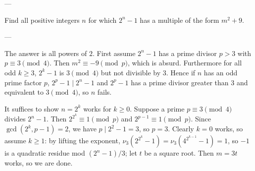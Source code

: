 
---

Find all positive integers $n$ for which $2^n-1$ has a multiple of the form $m^2+9$.

---

The answer is all powers of $2$. First assume $2^n-1$ has a prime divisor $p>3$ with $p\equiv3\pmod4$. Then $m^2\equiv-9\pmod p$, which is absurd. Furthermore for all odd $k\ge3$, $2^k-1$ is $3\pmod4$ but not divisible by $3$. Hence if $n$ has an odd prime factor $p$, $2^p-1\mid2^n-1$ and $2^p-1$ has a prime divisor greater than $3$ and equivalent to $3\pmod4$, so $n$ fails.

It suffices to show $n=2^k$ works for $k\ge0$. Suppose a prime $p\equiv3\pmod4$ divides $2^n-1$. Then $2^{2^k}\equiv1\pmod p$ and $2^{p-1}\equiv1\pmod p$. Since $\gcd(2^k,p-1)=2$, we have $p\mid2^2-1=3$, so $p=3$. Clearly $k=0$ works, so assume $k\ge1$: by lifting the exponent, $\nu_3(2^{2^k}-1)=\nu_3(4^{2^{k-1}}-1)=1$, so $-1$ is a quadratic residue mod $(2^n-1)/3$; let $t$ be a square root. Then $m=3t$ works, so we are done.

